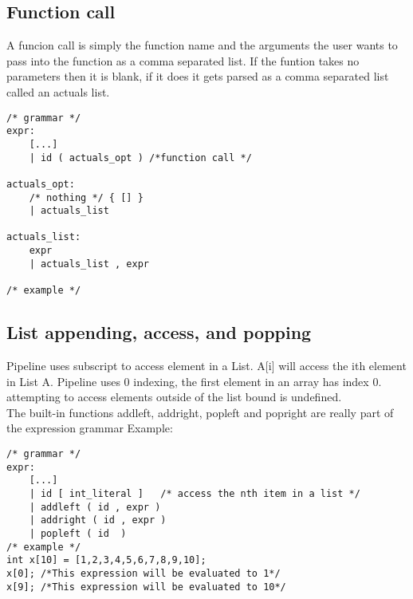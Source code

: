 \documentclass[./LRM_main.tex]{subfiles}
\begin{document}
\subsection{Function call}
A funcion call is simply the function name and the arguments the user wants to pass into the function as a comma separated list. If the funtion takes no parameters then it is blank, if it does it gets parsed as a comma separated list called an actuals list.
\begin{lstlisting}
/* grammar */
expr:
	[...]
    | id ( actuals_opt ) /*function call */
    
actuals_opt:
    /* nothing */ { [] }
    | actuals_list

actuals_list:
    expr
    | actuals_list , expr

/* example */

\end{lstlisting}
\subsection{List appending, access, and popping}
Pipeline uses subscript to access element in a List. A[i] will access the ith element in List A. Pipeline uses 0 indexing, the first element in an array has index 0.\\
attempting to access elements outside of the list bound is undefined.\\
The built-in functions addleft, addright, popleft and popright  are really part of the expression grammar
Example:
\begin{lstlisting}
/* grammar */
expr:
	[...]
    | id [ int_literal ]   /* access the nth item in a list */ 
    | addleft ( id , expr )  
    | addright ( id , expr ) 
    | popleft ( id  ) 
/* example */
int x[10] = [1,2,3,4,5,6,7,8,9,10];
x[0]; /*This expression will be evaluated to 1*/
x[9]; /*This expression will be evaluated to 10*/
\end{lstlisting}
\end{document}
